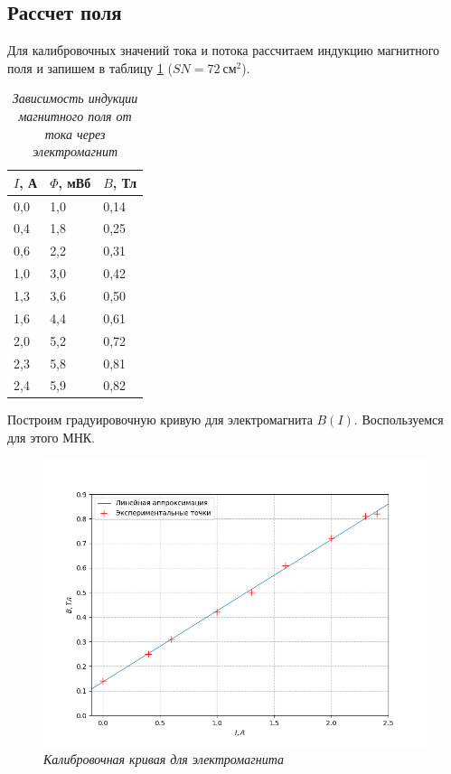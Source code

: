 \documentclass[a4paper,12pt]{article}
\begin{document}
\subsection{Рассчет поля}

Для калибровочных значений тока и потока рассчитаем индукцию магнитного поля и запишем в таблицу \ref{table:5} ($SN = 72 \ \text{см}^2$).

\begin{table}[!ht]
    \centering
    \begin{tabular}{|l|l|l|}
    \hline
        $I$, А & $\Phi$, мВб & $B$, Тл \\ \hline
        0,0 & 1,0 & 0,14 \\ \hline
        0,4 & 1,8 & 0,25 \\ \hline
        0,6 & 2,2 & 0,31 \\ \hline
        1,0 & 3,0 & 0,42 \\ \hline
        1,3 & 3,6 & 0,50 \\ \hline
        1,6 & 4,4 & 0,61 \\ \hline
        2,0 & 5,2 & 0,72 \\ \hline
        2,3 & 5,8 & 0,81 \\ \hline
        2,4 & 5,9 & 0,82 \\ \hline
    \end{tabular}\caption{\textit{Зависимость индукции магнитного поля от тока через электромагнит}}\label{table:5}
\end{table}

Построим градуировочную кривую для электромагнита $B(I)$. Воспользуемся для этого МНК.

\begin{figure}[!ht]
        \centering
	\includegraphics[scale=0.8]{calib_plot.png}
	\caption{\textit{Калибровочная кривая для электромагнита}}
	\label{graph:1}
\end{figure}
\end{document}
